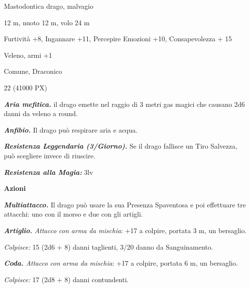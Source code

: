 \begin{multicols}{2}
{
\begin{description}[noitemsep, topsep=0pt, parsep=0pt, partopsep=0pt, itemsep=1pt, leftmargin=2.35cm,  labelwidth=2.2cm, itemindent=0cm, listparindent=0pt] %
\setlength{\baselineskip}{10pt}
\item[\textbf{Taglia/Tipo}] Mastodontica drago, malvagio
\item[\textbf{Caratt.}] 
\item[\textbf{Punti Ferita}] 
\item[\textbf{Movimento}] 12 m, nuoto 12 m, volo 24 m
\item[\textbf{Tiri Salvez.}] 
\item[\textbf{Comp.}] Furtività +8, Ingannare +11, Percepire Emozioni +10, Consapevolezza + 15
\item[\textbf{Imm. Danni}] Veleno, armi +1
\item[\textbf{Sensi}] 
\item[\textbf{Linguaggi}] Comune, Draconico
\item[\textbf{Sfida}] 22 (41000 PX)
\end{description}
\smallskip

\emph{\textbf{Aria mefitica.}} il drago emette nel raggio di 3 metri gas magici che causano 2d6 danni da veleno a round.

\emph{\textbf{Anfibio.}} Il drago può respirare aria e acqua.

\emph{\textbf{Resistenza Leggendaria (3/Giorno).}} Se il drago fallisce un Tiro Salvezza, può scegliere invece di riuscire.

\emph{\textbf{Resistenza alla Magia:}} 3lv

\textbf{Azioni}

\emph{\textbf{Multiattacco.}} Il drago può usare la sua Presenza Spaventosa e poi effettuare tre attacchi: uno con il morso e due con gli artigli.

\emph{\textbf{Artiglio.} Attacco con arma da mischia}: +17 a colpire, portata 3 m, un bersaglio.

\emph{Colpisce:} 15 (2d6 + 8) danni taglienti, 3/20 danno da Sanguinamento.

\emph{\textbf{Coda.} Attacco con arma da mischia}: +17 a colpire, portata 6 m, un bersaglio.

\emph{Colpisce:} 17 (2d8 + 8) danni contundenti.

}
\end{multicols}
